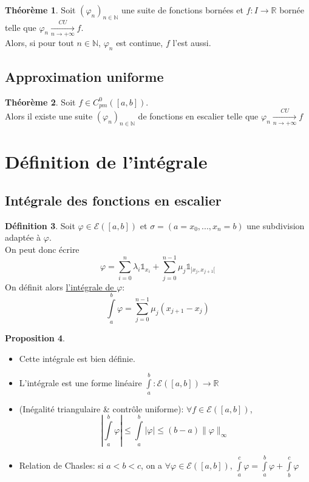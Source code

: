 \documentclass[10pt,a4paper]{article}
\theoremstyle{definition}
\newtheorem{proposition}{Proposition}[section]
\newtheorem{theorem}[proposition]{Théorème}
\newtheorem{definition}[proposition]{Définition}
\begin{document}
\begin{theorem}
Soit $(\varphi_n)_{n \in \mathbb{N}}$ une suite de fonctions bornées et $f: I \to \mathbb{R}$ bornée telle que $\varphi_n \xrightarrow[n \to +\infty]{CU} f$. \\
Alors, si pour tout $n \in \mathbb{N}$, $\varphi_n$ est continue, $f$ l'est aussi. 
\end{theorem}

\subsection{Approximation uniforme}
\begin{theorem}
Soit $f \in C^{0}_{pm}([a, b])$. \\
Alors il existe une suite $(\varphi_n)_{n \in \mathbb{N}}$ de fonctions en escalier telle que $\varphi_n \xrightarrow[n \to +\infty]{CU} f$
\end{theorem}

\section{Définition de l'intégrale}
\subsection{Intégrale des fonctions en escalier}
\begin{definition}
Soit $\varphi \in \mathcal{E}([a, b])$ et $\sigma = (a = x_0, ... , x_n = b)$ une subdivision adaptée à $\varphi$. \\
On peut donc écrire 
\[\varphi = \sum\limits_{i=0}^{n} \lambda_i \mathds{1}_{x_i} + \sum\limits_{j=0}^{n-1} \mu_j \mathds{1}_{]x_j, x_{j+1}[}\]
On définit alors \uline{l'intégrale de $\varphi$}: 
\[\int\limits_a^b \varphi = \sum\limits_{j=0}^{n-1} \mu_j (x_{j+1} - x_j)\]
\end{definition}

\pagebreak

\begin{proposition}
\hfill
\begin{itemize}
\item Cette intégrale est bien définie.
\item L'intégrale est une forme linéaire $\int\limits_a^b : \mathcal{E}([a, b]) \to \mathbb{R}$
\item (Inégalité triangulaire \textnormal{\&} contrôle uniforme): $ \forall f \in \mathcal{E}([a, b])$,
\[\left|\int\limits_a^b \varphi \right| \leq \int\limits_a^b |\varphi| \leq (b - a)\lVert \varphi \rVert_\infty\]
\item Relation de Chasles: si $a < b < c$, on a $\forall \varphi \in \mathcal{E}([a, b])$, $\int\limits_a^c \varphi = \int\limits_a^b \varphi + \int\limits_b^c \varphi$
\end{itemize}
\end{proposition}
\end{document}
